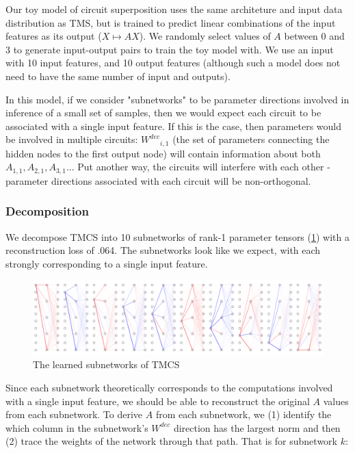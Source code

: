 \documentclass{article}
\theoremstyle{plain}
\theoremstyle{definition}
\theoremstyle{remark}
\begin{document}
Our toy model of circuit superposition uses the same architeture and input data distribution as TMS, but is trained to predict linear combinations of the input features as its output ($X \mapsto A X$). We randomly select values of $A$ between 0 and 3 to generate input-output pairs to train the toy model with. We use an input with 10 input features, and 10 output features (although such a model does not need to have the same number of input and outputs).

In this model, if we consider "subnetworks" to be parameter directions involved in inference of a small set of samples, then we would expect each circuit to be associated with a single input feature. If this is the case, then parameters would be involved in multiple circuits: ${W^{dec}}_{i,1}$ (the set of parameters connecting the hidden nodes to the first output node) will contain information about both $A_{1,1}, A_{2,1}, A_{3,1}...$  Put another way, the circuits will interfere with each other - parameter directions associated with each circuit will be non-orthogonal. 

\subsubsection{Decomposition}

We decompose TMCS into 10 subnetworks of rank-1 parameter tensors (\ref{fig:5_circuit_superposition_decomposition}) with a reconstruction loss of .064. The subnetworks look like we expect, with each strongly corresponding to a single input feature.


\begin{figure}[htbp]
    \centerline{\includegraphics[width=\textwidth]{../figures/5_circuit_superposition_decomposition.pdf}}
    \centering
    \caption{The learned subnetworks of TMCS}\label{fig:5_circuit_superposition_decomposition}
\end{figure}


Since each subnetwork theoretically corresponds to the computations involved with a single input feature, we should be able to reconstruct the original $A$ values from each subnetwork. To derive $A$ from each subnetwork, we (1) identify the which column in the subnetwork's $W^{dec}$ direction has the largest norm and then (2) trace the weights of the network through that path. That is for subnetwork $k$: 
\end{document}
